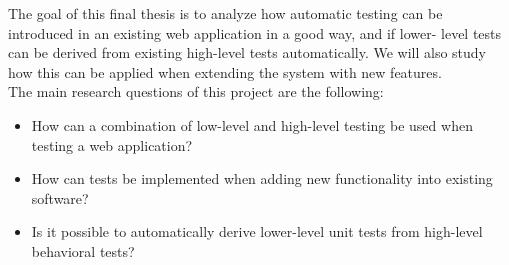 
The goal of this final thesis is to analyze how automatic testing can be
introduced in an existing web application in a good way, and if lower-
level tests can be derived from existing high-level tests automatically.
We will also study how this can be applied when extending the system
with new features.\\

The main research questions of this project are the following:

\begin{itemize}
    \item How can a combination of low-level and high-level testing be
          used when testing a web application?
    \item How can tests be implemented when adding new functionality
          into existing software?
    \item Is it possible to automatically derive lower-level unit tests
          from high-level behavioral tests?
\end{itemize}
